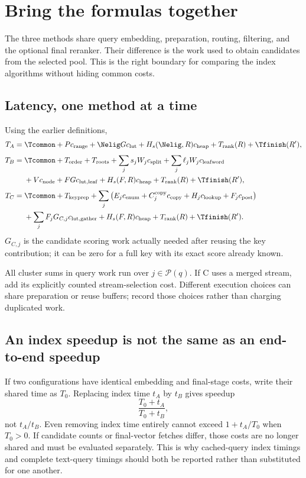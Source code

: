\section{Bring the formulas together}
\label{sec:comparison}
The three methods share query embedding, preparation, routing, filtering, and the optional
final reranker. Their difference is the work used to obtain candidates from the selected pool.
This is the right boundary for comparing the index algorithms without hiding common costs.

\subsection{Latency, one method at a time}
Using the earlier definitions,
\begin{align}
T_A={}&\Tcommon+P c_{\rm range}
 +\Nelig Gc_{\rm lut}+H_s(\Nelig,R)c_{\rm heap}
 +T_{\rm rank}(R)+\Tfinish(R'),\label{eq:final-A}\\[3pt]
T_B={}&\Tcommon+T_{\rm order}+T_{\rm roots}
 +\sum_j s_jW_jc_{\rm split}+\sum_j\ell_jW_jc_{\rm leafword}\notag\\
 &+Vc_{\rm node}+FGc_{\rm lut,leaf}
 +H_s(F,R)c_{\rm heap}+T_{\rm rank}(R)+\Tfinish(R'),\label{eq:final-B}\\[3pt]
T_C={}&\Tcommon+T_{\rm keyprep}
 +\sum_j\left(E_jc_{\rm enum}+C_j^{\rm copy}c_{\rm copy}
              +H_jc_{\rm lookup}+F_jc_{\rm post}\right)\notag\\
 &+\sum_j F_jG_{C,j}c_{\rm lut,gather}+H_s(F,R)c_{\rm heap}
 +T_{\rm rank}(R)+\Tfinish(R').\label{eq:final-C}
\end{align}
$G_{C,j}$ is the candidate scoring work actually needed after reusing the key contribution; it can be zero for a full key with its exact score already known.

All cluster sums in query work run over $j\in\mathcal P(q)$. If C uses a merged stream,
add its explicitly counted stream-selection cost. Different execution choices can share
preparation or reuse buffers; record those choices rather than charging duplicated work.

\subsection{An index speedup is not the same as an end-to-end speedup}
If two configurations have identical embedding and final-stage costs, write their shared time
as $T_0$. Replacing index time $t_A$ by $t_B$ gives speedup
\[
\frac{T_0+t_A}{T_0+t_B},
\]
not $t_A/t_B$. Even removing index time entirely cannot exceed $1+t_A/T_0$ when $T_0>0$.
If candidate counts or final-vector fetches differ, those costs are no longer shared and must
be evaluated separately. This is why cached-query index timings and complete text-query timings
should both be reported rather than substituted for one another.

